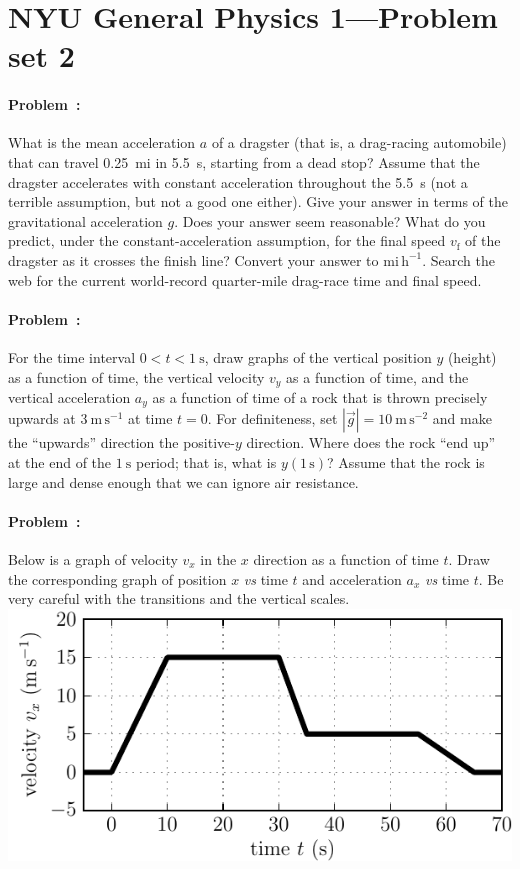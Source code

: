 \documentclass[12pt]{article}
\begin{document}
\thispagestyle{empty}

\section*{NYU General Physics 1---Problem set 2}

\paragraph{Problem~\theproblem:}%
What is the mean acceleration $a$ of a dragster (that is, a
drag-racing automobile) that can travel 0.25~mi in 5.5~s, starting
from a dead stop?  Assume that the dragster accelerates with constant
acceleration throughout the 5.5~s (not a terrible assumption, but not
a good one either).  Give your answer in terms of the gravitational
acceleration $g$.  Does your answer seem reasonable?  What do you
predict, under the constant-acceleration assumption, for the final
speed $v_\mathrm{f}$ of the dragster as it crosses the finish line?
Convert your answer to $\mathrm{mi\,h^{-1}}$.  Search the web for the
current world-record quarter-mile drag-race time and final speed.

\paragraph{Problem~\theproblem:}%
For the time interval $0<t<1~\mathrm{s}$, draw graphs of the vertical
position $y$ (height) as a function of time, the vertical velocity
$v_y$ as a function of time, and the vertical acceleration $a_y$ as a
function of time of a rock that is thrown precisely upwards at
$3~\mathrm{m\,s^{-1}}$ at time $t=0$.  For definiteness, set
$|\vec{g}|=10~\mathrm{m\,s^{-2}}$ and make the ``upwards'' direction the
positive-$y$ direction.  Where does the rock ``end up'' at the end of
the $1~\mathrm{s}$ period; that is, what is $y(1\,\mathrm{s})$?
Assume that the rock is large and dense enough that we can ignore air
resistance.

\paragraph{Problem~\theproblem:}%
Below is a graph of velocity $v_x$ in the $x$ direction as a function
of time $t$.  Draw the corresponding graph of position $x$ \textit{vs} time $t$ and
acceleration $a_x$ \textit{vs} time $t$.  Be very careful with the transitions and the
vertical scales.\\
\includegraphics{../py/vx_vs_t.pdf}
\end{document}

